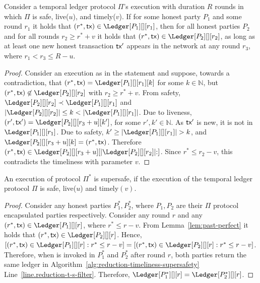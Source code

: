 \begin{lemma}\label{lem:past-perfect}
  Consider a temporal ledger protocol $\Pi$'s
  execution with duration $R$ rounds in which $\Pi$ is
  safe, live($u$), and timely($v$).
  If for some honest party $P_1$ and some round $r_1$ it holds that
  $(r^*, \tx) \in \Ledger[P_1][][r_1]$, then
  for all honest parties $P_2$ and for all rounds $r_2 \geq r^* + v$
  it holds that $(r^*, \tx) \in \Ledger[P_2][][r_2]$,
  as long as at least one new honest transaction $\textsf{tx}'$ appears in the
  network at any round $r_3$, where $r_1 < r_3 \leq R - u$.
\end{lemma}
\begin{proof}
  Consider an execution as in the statement and suppose, towards a contradiction,
  that $(r^*, \tx) = \Ledger[P_1][][r_1][k]$ for some $k \in \mathbb{N}$,
  but $(r^*, \tx) \not\in \Ledger[P_2][][r_2]$
  with $r_2 \geq r^* + v$.
  From safety,
  $\Ledger[P_2][][r_2] \prec \Ledger[P_1][][r_1]$ and
  $|\Ledger[P_2][][r_2]| \leq k < |\Ledger[P_1][][r_1]|$.
  Due to liveness, $(r', \tx') = \Ledger[P_2][][r_3 + u][k']$,
  for some $r', k' \in \mathbb{N}$.
  As $\textsf{tx}'$ is new, it is not in $\Ledger[P_1][][r_1]$.
  Due to safety, $k' \geq |\Ledger[P_1][][r_1]| > k$, and
  $\Ledger[P_2][][r_3 + u][k] = (r^*, \tx)$.
  Therefore
  $(r^*, \tx) \in \Ledger[P_2][][r_3 + u][|\Ledger[P_2][][r_2]|{:}]$.
  Since $r^* \leq r_2 - v$, this contradicts the timeliness with parameter $v$.\Qed
\end{proof}

\begin{conjecture}
  An execution of protocol $\Pi^*$ is supersafe, if the execution of the
  temporal ledger protocol $\Pi$ is safe, live($u$) and timely$(v)$.
\end{conjecture}
\begin{proof}
  Consider any honest parties $P_1^*,P_2^*$, where
  $P_1,P_2$ are their $\Pi$ protocol encapsulated parties respectively.
  Consider any round $r$ and any
  $(r^*, \tx) \in \Ledger[P_1][][r]$, where $r^* \leq r - v$.
  From Lemma~\ref{lem:past-perfect} it holds that
  $(r^*, \tx) \in \Ledger[P_2][][r]$. Hence, 
  $[(r^*, \tx) \in \Ledger[P_1][][r]: r^* \leq r - v] = [(r^*, \tx) \in \Ledger[P_2][][r]: r^* \leq r - v]$.
  Therefore, when \rread is invoked in $P_1^*$ and $P_2^*$ after round $r$, both
  parties return the same ledger in Algorithm~\ref{alg:reduction-timeliness-supersafety}
  Line~\ref{line.reduction-t-s-filter}. Therefore, $\Ledger[P_1^*][][r] = \Ledger[P_2^*][][r]$.

\end{proof}

